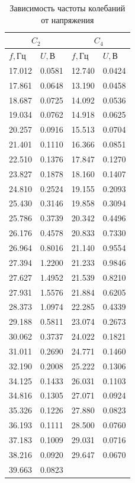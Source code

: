 \documentclass[a4paper]{article}
\begin{document}
\begin{enumerate}
\begin{table}[h]
    \centering
    \begin{center}
    \caption{Зависимость частоты колебаний от напряжения}
    \end{center}
    \vspace{0.1cm}
    \label{tab:my_label}
    \begin{tabular}{ |p{2cm}|p{2cm}||p{2cm}|p{2cm}|}
 \hline
 \multicolumn{2}{|c|}{$C_2$} & \multicolumn{2}{c|}{$C_4$} \\
 \hline
    $f, $Гц & $U, $В &  $f, $Гц & $U, $В \\
\hline
    17.012 & 0.0581	& 12.740 &	0.0424 \\
    \hline
17.861 &	0.0648 &	13.190 &	0.0458 \\
    \hline
18.687 &	0.0725 &	14.092 &	0.0536 \\
    \hline
19.034 &	0.0762 &	14.918 &	0.0625 \\
    \hline
20.257 &	0.0916 &	15.513 &	0.0704 \\
    \hline
21.401 &	0.1110 &	16.366 &	0.0851 \\
    \hline
22.510 &	0.1376 &	17.847 &	0.1270 \\
    \hline
23.827 &	0.1878 &	18.160 &	0.1407 \\
    \hline
24.810 &	0.2524 &	19.155 &	0.2093 \\
    \hline
25.430 &	0.3146 &	19.858 &	0.3094 \\
    \hline
25.786 &	0.3739 &	20.342 &	0.4496 \\
    \hline
26.176 &	0.4578 &	20.833 &	0.7330 \\
    \hline
26.964 &	0.8016 &	21.140 &	0.9554 \\
    \hline
27.394 &	1.2200 &	21.233 &	0.9846 \\
    \hline
27.627 &	1.4952 &	21.539 &	0.8210 \\
    \hline
27.931 &	1.5576 &	21.884 &	0.6205 \\
    \hline
28.373 &	1.0974 &	22.285 &	0.4339 \\
    \hline
29.188 &	0.5811 &	23.074 &	0.2673 \\
    \hline
30.062 &	0.3737 &	24.022 &	0.1821 \\
    \hline
31.011 &	0.2690 &	24.771 &	0.1460 \\
    \hline
32.190 &	0.2008 &	25.222 &	0.1306 \\
    \hline
34.125 &	0.1433 &	26.031 &	0.1103 \\
    \hline
34.816 &	0.1305 &	27.071 &	0.0924 \\
    \hline
35.326 &	0.1226 &	27.880 &	0.0823 \\
    \hline
36.193 &	0.1111 &	28.500 &	0.0760 \\
    \hline
37.183 &	0.1009 &	29.031 &	0.0716 \\
    \hline
38.216 &	0.0920 &	29.647 &	0.0670 \\
    \hline
39.663 &	0.0823 & & \\	
    \hline
    \end{tabular}
\end{table} 




\end{enumerate}
\end{document}
